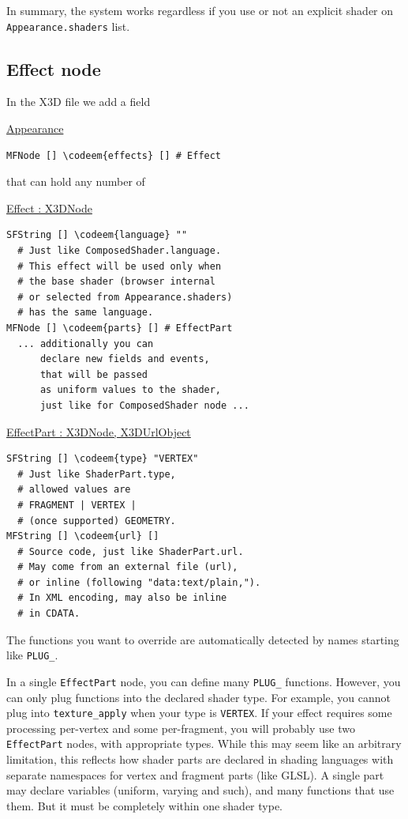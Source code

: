 \documentclass{acmsiggraph}                     %
\newenvironment{mycode}
{\begin{mycodecore}}
{\end{mycodecore}
\vspace{-0.1in}}
\newcommand*{\codeem}[1]{\textbf{#1}}
\begin{document}
In summary, the system works regardless if you use or not an explicit
shader on \texttt{Appearance.shaders} list.

\subsection{Effect node}

In the X3D file we add a field

\begin{mycode}
\underline{Appearance}
\begin{Verbatim}[commandchars=\\\{\}]
MFNode [] \codeem{effects} [] # Effect
\end{Verbatim}
\end{mycode}

that can hold any number of

\begin{mycode}
\underline{Effect : X3DNode}
\begin{Verbatim}[commandchars=\\\{\}]
SFString [] \codeem{language} ""
  # Just like ComposedShader.language.
  # This effect will be used only when
  # the base shader (browser internal
  # or selected from Appearance.shaders)
  # has the same language.
MFNode [] \codeem{parts} [] # EffectPart
  ... additionally you can
      declare new fields and events,
      that will be passed
      as uniform values to the shader,
      just like for ComposedShader node ...
\end{Verbatim}
\end{mycode}

\begin{mycode}
\underline{EffectPart : X3DNode, X3DUrlObject}
\begin{Verbatim}[commandchars=\\\{\}]
SFString [] \codeem{type} "VERTEX"
  # Just like ShaderPart.type,
  # allowed values are
  # FRAGMENT | VERTEX |
  # (once supported) GEOMETRY.
MFString [] \codeem{url} []
  # Source code, just like ShaderPart.url.
  # May come from an external file (url),
  # or inline (following "data:text/plain,").
  # In XML encoding, may also be inline
  # in CDATA.
\end{Verbatim}
\end{mycode}

The functions you want to override are automatically detected by names
starting like \texttt{PLUG\_}.

In a single \texttt{EffectPart} node, you can define many \texttt{PLUG\_}
functions. However, you can only plug functions into the declared shader
type. For example, you cannot plug into \texttt{texture\_apply} when
your type is \texttt{VERTEX}.
If your effect requires some processing per-vertex and some per-fragment,
you will probably use two \texttt{EffectPart} nodes, with appropriate types.
While this may seem like an arbitrary limitation,
this reflects how shader parts are declared in shading languages with
separate namespaces for vertex and fragment parts (like GLSL).
A single part may declare variables (uniform, varying and such),
and many functions that use them. But it must be completely within
one shader type.
\end{document}
